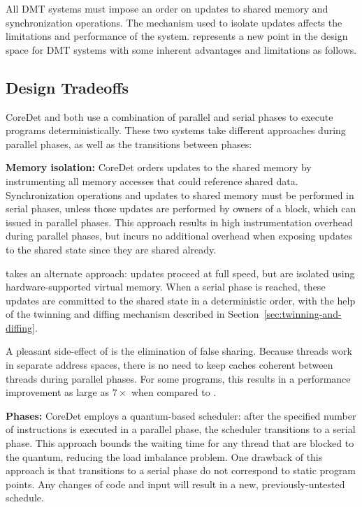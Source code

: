 \label{sec:discussion} All DMT systems must impose an order on updates to shared memory and synchronization operations.  The
mechanism used to isolate updates affects the limitations and performance of the
system.  \dthreads{} represents a new point in the design space for DMT systems with some inherent advantages and limitations as follows.

\subsection{Design Tradeoffs} 

CoreDet and \dthreads{} both use a combination of
parallel and serial phases to execute programs deterministically.  These two systems take different approaches during parallel phases, as
well as the transitions between phases:

\textbf{Memory isolation:} 
CoreDet orders updates to the shared memory by
instrumenting all memory accesses that could reference shared data. Synchronization operations and updates to shared memory must be performed in serial phases, unless those updates are performed by owners of a block, which can issued in parallel phases. This approach results in high instrumentation overhead during parallel phases, but incurs no additional overhead when exposing updates to the shared state since they are shared already.

\dthreads{} takes an alternate approach: updates proceed at full speed, but are isolated using hardware-supported virtual memory.  When a serial phase is reached, these updates are committed to the shared state in a deterministic order, with
the help of the twinning and diffing mechanism described in Section~\ref{sec:twinning-and-diffing}.

A pleasant side-effect of \dthreads{} is the elimination of false sharing. Because threads work in separate address spaces, there is no need to keep caches coherent between threads during parallel phases.  For some programs, this results in a performance improvement as large as $7\times$ when compared to
\pthreads{}.

\textbf{Phases:} 
CoreDet employs a quantum-based scheduler: after the specified number of instructions is executed in a parallel phase, the scheduler transitions to a serial phase. This approach bounds the waiting time for any thread that are blocked to the quantum, reducing the load imbalance problem.  One drawback of this approach is that transitions to a serial phase do not correspond to static program points.  Any changes of code and input will result in a new, previously-untested schedule.

